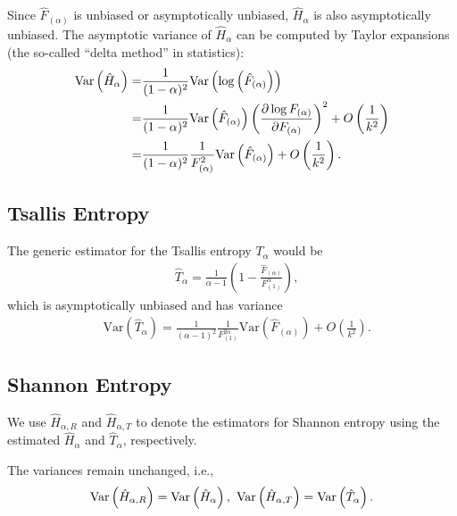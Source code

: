 \documentclass{sig-alternate}
\begin{document}
Since $\hat{F}_{(\alpha)}$ is unbiased or asymptotically unbiased, $\hat{H}_{\alpha}$ is also asymptotically unbiased. The asymptotic variance of $\hat{H}_{\alpha}$ can be computed by Taylor expansions (the so-called ``delta method'' in statistics):
\begin{align}\notag
\text{Var}\left( \hat{H}_\alpha \right) =& \frac{1}{(1-\alpha)^2} \text{Var}\left( \log \left(\hat{F}_{(\alpha)}\right)\right)\\\notag
=& \frac{1}{(1-\alpha)^2} \text{Var}\left(\hat{F}_{(\alpha)}\right)\left( \frac{\partial \log F_{(\alpha)}}{\partial F_{(\alpha)}}  \right)^2 + O\left(\frac{1}{k^2}\right)\\\label{eqn_Renyi_est_var}
=& \frac{1}{(1-\alpha)^2} \frac{1}{F_{(\alpha)}^2} \text{Var}\left(\hat{F}_{(\alpha)}\right) + O\left(\frac{1}{k^2}\right).
\end{align}



\subsection{Tsallis Entropy}
The generic estimator for the Tsallis entropy $T_\alpha$ would be
\begin{align}\label{eqn_Tsallis_est}
&\hat{T}_\alpha = \frac{1}{\alpha -1} \left( 1 - \frac{\hat{F}_{(\alpha)}}{F_{(1)}^\alpha}\right),
\end{align}
which is asymptotically unbiased and has variance
\begin{align}\label{eqn_Tsallis_est_var}
&\text{Var}\left(\hat{T}_\alpha\right) = \frac{1}{(\alpha -1)^2} \frac{1}{F_{(1)}^{2\alpha}}
 \text{Var}\left(\hat{F}_{(\alpha)}\right) + O\left(\frac{1}{k^2}\right).
\end{align}

\subsection{Shannon Entropy}


We use $\hat{H}_{\alpha,R}$ and $\hat{H}_{\alpha,T}$ to denote the estimators for Shannon entropy using the estimated $\hat{H}_{\alpha}$ and $\hat{T}_{\alpha}$, respectively.

The variances remain unchanged, i.e.,
\begin{align}\label{eqn_entropy_var}
\text{Var}\left(\hat{H}_{\alpha,R}\right) = \text{Var}\left(\hat{H}_{\alpha}\right), \hspace{0.05in} \text{Var}\left(\hat{H}_{\alpha,T}\right) = \text{Var}\left(\hat{T}_{\alpha}\right).
\end{align}
\end{document}
